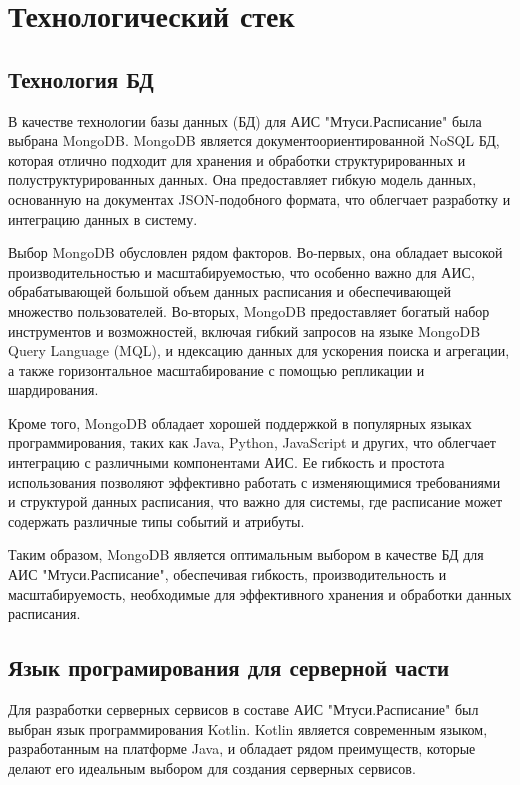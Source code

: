 \section{Технологический стек}

\subsection{Технология БД}
В качестве технологии базы данных (БД) для АИС "Мтуси.Расписание" 
была выбрана MongoDB. MongoDB является документоориентированной NoSQL БД, 
которая отлично подходит для хранения и 
обработки структурированных и полуструктурированных данных. 
Она предоставляет гибкую модель данных, 
основанную на документах JSON-подобного формата, 
что облегчает разработку и интеграцию данных в систему.

Выбор MongoDB обусловлен рядом факторов. Во-первых, она обладает высокой производительностью и масштабируемостью, 
что особенно важно для АИС, обрабатывающей большой объем данных расписания и обеспечивающей множество пользователей. 
Во-вторых, MongoDB предоставляет богатый набор инструментов и возможностей, 
включая гибкий запросов на языке MongoDB Query Language (MQL), и
ндексацию данных для ускорения поиска и агрегации, а также горизонтальное 
масштабирование с помощью репликации и шардирования.

Кроме того, MongoDB обладает хорошей поддержкой в популярных языках программирования, 
таких как Java, Python, JavaScript и других, что облегчает интеграцию с различными компонентами АИС. 
Ее гибкость и простота использования позволяют эффективно работать с изменяющимися 
требованиями и структурой данных расписания, что важно для системы, 
где расписание может содержать различные типы событий и атрибуты.

Таким образом, MongoDB является оптимальным выбором в 
качестве БД для АИС "Мтуси.Расписание", обеспечивая гибкость, производительность 
и масштабируемость, необходимые для эффективного хранения и обработки данных расписания.

\subsection{Язык програмирования для серверной части}
Для разработки серверных сервисов в составе АИС "Мтуси.Расписание" был выбран язык программирования Kotlin. 
Kotlin является современным языком, разработанным на платформе Java, и обладает рядом преимуществ, 
которые делают его идеальным выбором для создания серверных сервисов.

